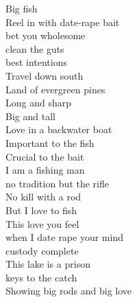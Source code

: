 Big fish\\
Reel in with date-rape bait\\
bet you wholesome\\
clean the guts\\
best intentions\\
Travel down south\\
Land of evergreen pines\\
Long and sharp\\
Big and tall\\
Love in a backwater boat\\
Important to the fish\\
Crucial to the bait\\
I am a fishing man\\
no tradition but the rifle\\
No kill with a rod\\
But I love to fish\\
This love you feel\\
when I date rape your mind\\
custody complete\\
This lake is a prison\\
keys to the catch\\
Showing big rods and big love\\

